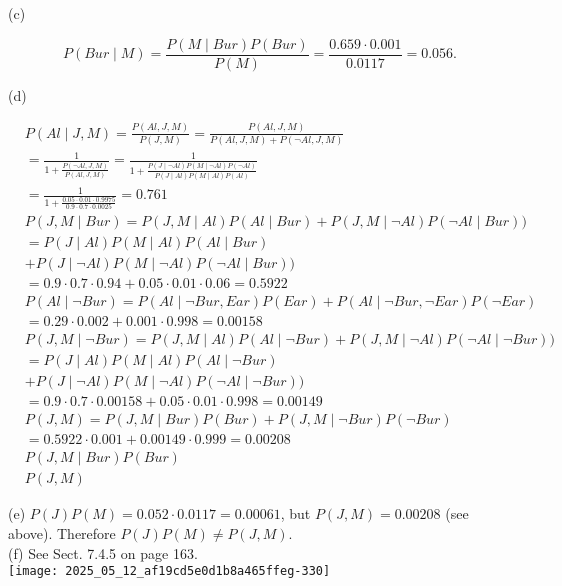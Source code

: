 \documentclass[10pt]{article}
\begin{document}
(c)

$$
P(B u r \mid M)=\frac{P(M \mid B u r) P(B u r)}{P(M)}=\frac{0.659 \cdot 0.001}{0.0117}=0.056 .
$$

(d)

$$
\begin{aligned}
& P(A l \mid J, M)= \frac{P(A l, J, M)}{P(J, M)}=\frac{P(A l, J, M)}{P(A l, J, M)+P(\neg A l, J, M)} \\
&= \frac{1}{1+\frac{P(\neg A l, J, M)}{P(A l, J, M)}}=\frac{1}{1+\frac{P(J \mid \neg A l) P(M \mid \neg A l) P(\neg A l)}{P(J \mid A l) P(M \mid A l) P(A l)}} \\
&= \frac{1}{1+\frac{0.05 \cdot 0.01 \cdot 0.9975}{0.9 \cdot 0.7 \cdot 0.0025}}=0.761 \\
& P(J, M \mid B u r)=P(J, M \mid A l) P(A l \mid B u r)+P(J, M \mid \neg A l) P(\neg A l \mid B u r)) \\
&= P(J \mid A l) P(M \mid A l) P(A l \mid B u r) \\
&+P(J \mid \neg A l) P(M \mid \neg A l) P(\neg A l \mid B u r)) \\
&= 0.9 \cdot 0.7 \cdot 0.94+0.05 \cdot 0.01 \cdot 0.06=0.5922 \\
& P(A l \mid \neg B u r)= P(A l \mid \neg B u r, E a r) P(E a r)+P(A l \mid \neg B u r, \neg E a r) P(\neg E a r) \\
&= 0.29 \cdot 0.002+0.001 \cdot 0.998=0.00158 \\
& P(J, M \mid \neg B u r)=P(J, M \mid A l) P(A l \mid \neg B u r)+P(J, M \mid \neg A l) P(\neg A l \mid \neg B u r)) \\
&= P(J \mid A l) P(M \mid A l) P(A l \mid \neg B u r) \\
&+P(J \mid \neg A l) P(M \mid \neg A l) P(\neg A l \mid \neg B u r)) \\
&= 0.9 \cdot 0.7 \cdot 0.00158+0.05 \cdot 0.01 \cdot 0.998=0.00149 \\
& P(J, M)= P(J, M \mid B u r) P(B u r)+P(J, M \mid \neg B u r) P(\neg B u r) \\
&= 0.5922 \cdot 0.001+0.00149 \cdot 0.999=0.00208 \\
& P(J, M \mid B u r) P(B u r) \\
& P(J, M)
\end{aligned}
$$

(e) $P(J) P(M)=0.052 \cdot 0.0117=0.00061$, but $P(J, M)=0.00208$ (see above). Therefore $P(J) P(M) \neq P(J, M)$.\\
(f) See Sect. 7.4.5 on page 163.\\
\texttt{[image: 2025\_05\_12\_af19cd5e0d1b8a465ffeg-330]}
\end{document}
